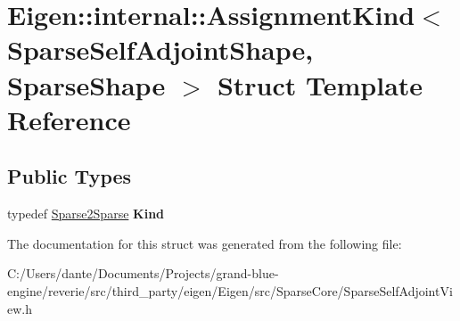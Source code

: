 \hypertarget{struct_eigen_1_1internal_1_1_assignment_kind_3_01_sparse_self_adjoint_shape_00_01_sparse_shape_01_4}{}\section{Eigen\+::internal\+::Assignment\+Kind$<$ Sparse\+Self\+Adjoint\+Shape, Sparse\+Shape $>$ Struct Template Reference}
\label{struct_eigen_1_1internal_1_1_assignment_kind_3_01_sparse_self_adjoint_shape_00_01_sparse_shape_01_4}
\subsection*{Public Types}
\begin{DoxyCompactItemize}
\item 
\mbox{\label{struct_eigen_1_1internal_1_1_assignment_kind_3_01_sparse_self_adjoint_shape_00_01_sparse_shape_01_4_aba0977d730379a1756e92f38120d1e54}} 
typedef \mbox{\hyperlink{struct_eigen_1_1internal_1_1_sparse2_sparse}{Sparse2\+Sparse}} {\bfseries Kind}
\end{DoxyCompactItemize}


The documentation for this struct was generated from the following file\+:\begin{DoxyCompactItemize}
\item 
C\+:/\+Users/dante/\+Documents/\+Projects/grand-\/blue-\/engine/reverie/src/third\+\_\+party/eigen/\+Eigen/src/\+Sparse\+Core/Sparse\+Self\+Adjoint\+View.\+h\end{DoxyCompactItemize}
